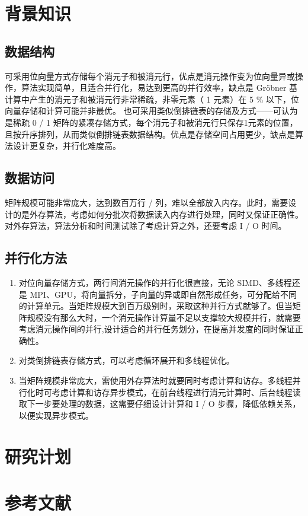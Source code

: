 \documentclass[a4paper]{article}
\begin{document}
\section{背景知识}

\subsection{数据结构}

可采用位向量方式存储每个消元子和被消元行，优点是消元操作变为位向量异或操作，算法实现简单，且适合并行化，易达到更高的并行效率，缺点是 Gröbner 基计算中产生的消元子和被消元行非常稀疏，非零元素（ 1 元素）在 5 \% 以下，位向量存储和计算可能并非最优。
也可采用类似倒排链表的存储及方式——可认为是稀疏 0 / 1 矩阵的紧凑存储方式，每个消元子和被消元行只保存1元素的位置，且按升序排列，从而类似倒排链表数据结构。优点是存储空间占用更少，缺点是算法设计更复杂，并行化难度高。

\subsection{数据访问}

矩阵规模可能非常庞大，达到数百万行 / 列，难以全部放入内存。此时，需要设计的是外存算法，考虑如何分批次将数据读入内存进行处理，同时又保证正确性。对外存算法，算法分析和时间测试除了考虑计算之外，还要考虑 I / O 时间。

\subsection{并行化方法}

\begin{enumerate}
  \item 对位向量存储方式，两行间消元操作的并行化很直接，无论 SIMD、多线程还是 MPI、GPU，将向量拆分，子向量的异或即自然形成任务，可分配给不同的计算单元。当矩阵规模大到百万级别时，采取这种并行方式就够了。但当矩阵规模没有那么大时，一个消元操作计算量不足以支撑较大规模并行，就需要考虑消元操作间的并行,设计适合的并行任务划分，在提高并发度的同时保证正确性。
  \item 对类倒排链表存储方式，可以考虑循环展开和多线程优化。
  \item 当矩阵规模非常庞大，需使用外存算法时就要同时考虑计算和访存。多线程并行化时可考虑计算和访存异步模式，在前台线程进行消元计算时、后台线程读取下一步要处理的数据，这需要仔细设计计算和 I / O 步骤，降低依赖关系，以便实现异步模式。
\end{enumerate}

\section{研究计划}

\newpage

\section{参考文献}
\cite{1}\cite{2}



\end{document}
